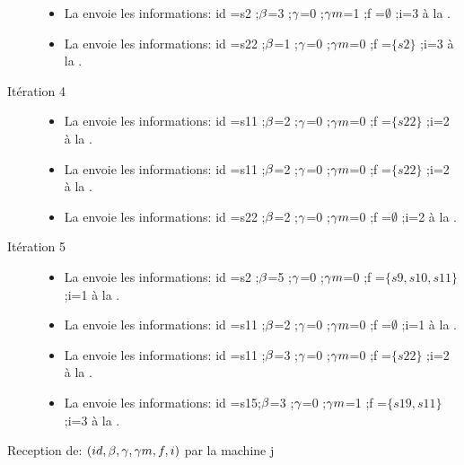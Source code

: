\begin{Exemple}
\begin{description}
\begin{itemize}
			\item  La \mtree{} envoie les informations: id =s2 ;$\beta{}$=3 ;$\gamma{}$=0 ;$\gamma m{}$=1 ;f =$\emptyset$ ;i=3 à la \mone{}.
			\item  La \mtree{} envoie les informations: id =s22 ;$\beta{}$=1 ;$\gamma{}$=0 ;$\gamma m{}$=0 ;f =$\{s2\}$ ;i=3 à la \mtwo{}.
			\end{itemize}
		\item[Itération 4]
		\begin{itemize}
			\item  La \mtwo{} envoie les informations: id =s11 ;$\beta{}$=2 ;$\gamma{}$=0 ;$\gamma m{}$=0 ;f =$\{s22\}$ ;i=2 à la \mone{}.
			\item  La \mtwo{} envoie les informations: id =s11 ;$\beta{}$=2 ;$\gamma{}$=0 ;$\gamma m{}$=0 ;f =$\{s22\}$ ;i=2 à la \mtree{}.
			\item  La \mtwo{} envoie les informations: id =s22 ;$\beta{}$=2 ;$\gamma{}$=0 ;$\gamma m{}$=0 ;f =$\emptyset$ ;i=2 à la \mtwo{}.
			\end{itemize}
			\item[Itération 5]
		\begin{itemize}
		\item  La \mone{} envoie les informations: id =s2 ;$\beta{}$=5 ;$\gamma{}$=0 ;$\gamma m{}$=0 ;f =$\{s9,s10,s11\}$ ;i=1 à la \mtree{}.
			\item  La \mone{} envoie les informations: id =s11 ;$\beta{}$=2 ;$\gamma{}$=0 ;$\gamma m{}$=0 ;f =$\emptyset$ ;i=1 à la \mtwo{}.
			\item  La \mtree{} envoie les informations: id =s11 ;$\beta{}$=3 ;$\gamma{}$=0 ;$\gamma m{}$=0 ;f =$\{s22\}$ ;i=2 à la \mtwo{}.
			\item La \mtree{} envoie les informations: id =s15;$\beta{}$=3 ;$\gamma{}$=0 ;$\gamma m{}$=1 ;f =$\{s19,s11\}$ ;i=3	 à la \mtwo{}.
			\end{itemize}	
	\end{description}

\end{Exemple}

\begin{procedure}
\setcounter{AlgoLine}{0}	
\SetAlgoLined
\LinesNumbered
  \caption{Reception de: $(id,\beta{},\gamma{},\gamma m{},f,i)$ par la machine j}
\end{procedure}

